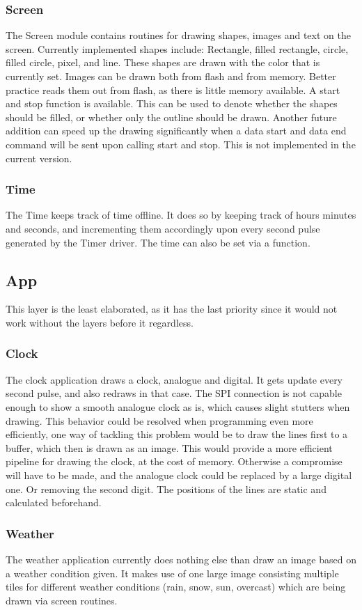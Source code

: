\subsubsection{Screen}
The Screen module contains routines for drawing shapes, images and text on the screen. Currently implemented shapes include: Rectangle, filled rectangle, circle, filled circle, pixel, and line. These shapes are drawn with the color that is currently set. Images can be drawn both from flash and from memory. Better practice reads them out from flash, as there is little memory available. A start and stop function is available. This can be used to denote whether the shapes should be filled, or whether only the outline should be drawn. Another future addition can speed up the drawing significantly when a data start and data end command will be sent upon calling start and stop. This is not implemented in the current version.
\subsubsection{Time}
The Time keeps track of time offline. It does so by keeping track of hours minutes and seconds, and incrementing them accordingly upon every second pulse generated by the Timer driver. The time can also be set via a function.
\subsection{App}
This layer is the least elaborated, as it has the last priority since it would not work without the layers before it regardless.
\subsubsection{Clock}
The clock application draws a clock, analogue and digital. It gets update every second pulse, and also redraws in that case. The SPI connection is not capable enough to show a smooth analogue clock as is, which causes slight stutters when drawing. This behavior could be resolved when programming even more efficiently, one way of tackling this problem would be to draw the lines first to a buffer, which then is drawn as an image. This would provide a more efficient pipeline for drawing the clock, at the cost of memory. Otherwise a compromise will have to be made, and the analogue clock could be replaced by a large digital one. Or removing the second digit. The positions of the lines are static and calculated beforehand.
\subsubsection{Weather}
The weather application currently does nothing else than draw an image based on a weather condition given. It makes use of one large image consisting multiple tiles for different weather conditions (rain, snow, sun, overcast) which are being drawn via screen routines.
